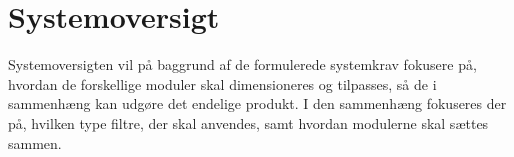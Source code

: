 \chapter{Systemoversigt}
\label{Systemoversigt}
Systemoversigten vil på baggrund af de formulerede systemkrav fokusere på, hvordan de forskellige moduler skal dimensioneres og tilpasses, så de i sammenhæng kan udgøre det endelige produkt. I den sammenhæng fokuseres der på, hvilken type filtre, der skal anvendes, samt hvordan modulerne skal sættes sammen.


